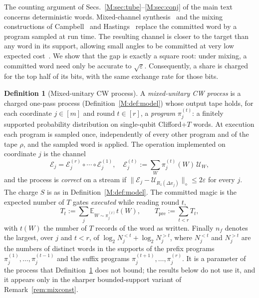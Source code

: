 \documentclass[aps,prx,twocolumn,superscriptaddress,nofootinbib,longbibliography]{revtex4-2}
\theoremstyle{plain}
\theoremstyle{definition}
\newtheorem{definition}{Definition}
\theoremstyle{remark}
\newcommand{\Tpre}{T_{\mathrm{pre}}}
\newcommand{\E}{\mathbb{E}}
\begin{document}
The counting argument of Secs.~\ref{M:sec:tube}--\ref{M:sec:conj} of the main text concerns deterministic words. Mixed-channel synthesis~\cite{KLMPP,Bothe} and the mixing constructions of Campbell~\cite{Campbell17} and Hastings~\cite{Hastings17} replace the committed word by a program sampled at run time. The resulting channel is closer to the target than any word in its support, allowing small angles to be committed at very low expected cost~\cite{Bothe}. We show that the gap is exactly a square root: under mixing, a committed word need only be accurate to $\sqrt\varepsilon$. Consequently, a share is charged for the top half of its bits, with the same exchange rate for those bits.

\begin{definition}[Mixed-unitary CW process]\label{def:mixed}
A \emph{mixed-unitary CW process} is a charged one-pass process (Definition~\ref{M:def:model}) whose output tape holds, for each coordinate $j\in[m]$ and round $t\in[r]$, a \emph{program} $\pi^{(t)}_j$: a finitely supported probability distribution on single-qubit Clifford+$T$ words. At execution each program is sampled once, independently of every other program and of the tape $\rho$, and the sampled word is applied. The operation implemented on coordinate $j$ is the channel
\begin{equation}
\mathcal E_j=\mathcal E^{(r)}_j\circ\cdots\circ\mathcal E^{(1)}_j,\quad
\mathcal E^{(t)}_j:=\sum_{W}\pi^{(t)}_j(W)\,\mathcal U_W,
\end{equation}
and the process is \emph{correct} on a stream if $\|\mathcal E_j-\mathcal U_{R_z(\Delta x_j)}\|_\diamond\le2\varepsilon$ for every $j$. The charge $S$ is as in Definition~\ref{M:def:model}. The committed magic is the expected number of $T$ gates \emph{executed} while reading round $t$,
\begin{equation}
T_t:=\sum_j\E_{W\sim\pi^{(t)}_j}t(W),\qquad\Tpre:=\sum_{t<r}T_t,
\end{equation}
with $t(W)$ the number of $T$ records of the word as written. Finally $n_f$ denotes the largest, over $j$ and $t<r$, of $\log_2N^{<t}_j+\log_2N^{>t}_j$, where $N^{<t}_j$ and $N^{>t}_j$ are the numbers of distinct words in the supports of the prefix programs $\pi^{(1)}_j,\dots,\pi^{(t-1)}_j$ and the suffix programs $\pi^{(t+1)}_j,\dots,\pi^{(r)}_j$. It is a parameter of the process that Definition~\ref{def:mixed} does not bound; the results below do not use it, and it appears only in the sharper bounded-support variant of Remark~\ref{rem:mixconst}.
\end{definition}
\end{document}
